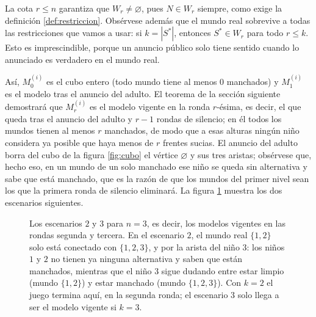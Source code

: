 La cota $r \le n$ garantiza que $W_r \ne \varnothing$, pues $N \in W_r$ siempre, como exige la definición \ref{def:restriccion}. Obsérvese además que el mundo real sobrevive a todas las restricciones que vamos a usar: si $k = |S^{*}|$, entonces $S^{*} \in W_r$ para todo $r \le k$. Esto es imprescindible, porque un anuncio público solo tiene sentido cuando lo anunciado es verdadero en el mundo real.

Así, $M_0^{(i)}$ es el cubo entero (todo mundo tiene al menos $0$ manchados) y $M_1^{(i)}$ es el modelo tras el anuncio del adulto. El teorema de la sección siguiente demostrará que $M_r^{(i)}$ es el modelo vigente en la ronda $r$-ésima, es decir, el que queda tras el anuncio del adulto y $r-1$ rondas de silencio; en él todos los mundos tienen al menos $r$ manchados, de modo que a esas alturas ningún niño considera ya posible que haya menos de $r$ frentes sucias. El anuncio del adulto borra del cubo de la figura \ref{fig:cubo} el vértice $\varnothing$ y sus tres aristas; obsérvese que, hecho eso, en un mundo de un solo manchado ese niño se queda sin alternativa y sabe que está manchado, que es la razón de que los mundos del primer nivel sean los que la primera ronda de silencio eliminará. La figura \ref{fig:escenario23} muestra los dos escenarios siguientes.

\begin{figure}[htb]
\centering
{}
\caption{Los escenarios $2$ y $3$ para $n=3$, es decir, los modelos vigentes en las rondas segunda y tercera. En el escenario $2$, el mundo real $\{1,2\}$ solo está conectado con $\{1,2,3\}$, y por la arista del niño $3$: los niños $1$ y $2$ no tienen ya ninguna alternativa y saben que están manchados, mientras que el niño $3$ sigue dudando entre estar limpio (mundo $\{1,2\}$) y estar manchado (mundo $\{1,2,3\}$). Con $k=2$ el juego termina aquí, en la segunda ronda; el escenario $3$ solo llega a ser el modelo vigente si $k=3$.}
\label{fig:escenario23}
\end{figure}

